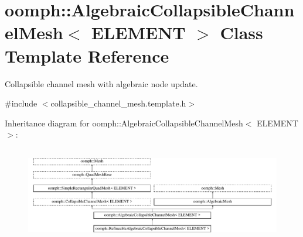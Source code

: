 \hypertarget{classoomph_1_1AlgebraicCollapsibleChannelMesh}{}\section{oomph\+:\+:Algebraic\+Collapsible\+Channel\+Mesh$<$ E\+L\+E\+M\+E\+NT $>$ Class Template Reference}
\label{classoomph_1_1AlgebraicCollapsibleChannelMesh}


Collapsible channel mesh with algebraic node update.  




{\ttfamily \#include $<$collapsible\+\_\+channel\+\_\+mesh.\+template.\+h$>$}

Inheritance diagram for oomph\+:\+:Algebraic\+Collapsible\+Channel\+Mesh$<$ E\+L\+E\+M\+E\+NT $>$\+:\begin{figure}[H]
\begin{center}
\leavevmode
\includegraphics[height=4.200000cm]{classoomph_1_1AlgebraicCollapsibleChannelMesh}
\end{center}
\end{figure}
